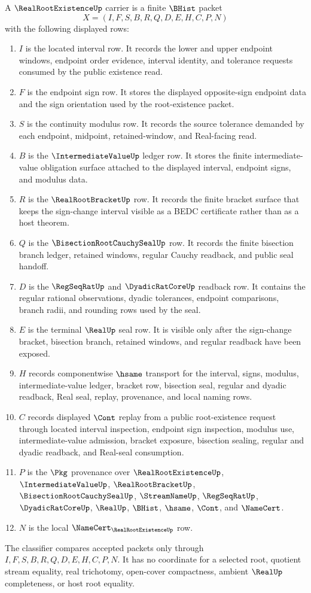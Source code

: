 \begin{definition}\label{def:real-root-existence-carrier}
A $\RealRootExistenceUp$ carrier is a finite $\BHist$ packet
$$
X=(I,F,S,B,R,Q,D,E,H,C,P,N)
$$
with the following displayed rows:
\begin{enumerate}
\item $I$ is the located interval row. It records the lower and upper endpoint windows, endpoint order evidence, interval identity, and tolerance requests consumed by the public existence read.
\item $F$ is the endpoint sign row. It stores the displayed opposite-sign endpoint data and the sign orientation used by the root-existence packet.
\item $S$ is the continuity modulus row. It records the source tolerance demanded by each endpoint, midpoint, retained-window, and Real-facing read.
\item $B$ is the $\IntermediateValueUp$ ledger row. It stores the finite intermediate-value obligation surface attached to the displayed interval, endpoint signs, and modulus data.
\item $R$ is the $\RealRootBracketUp$ row. It records the finite bracket surface that keeps the sign-change interval visible as a BEDC certificate rather than as a host theorem.
\item $Q$ is the $\BisectionRootCauchySealUp$ row. It records the finite bisection branch ledger, retained windows, regular Cauchy readback, and public seal handoff.
\item $D$ is the $\RegSeqRatUp$ and $\DyadicRatCoreUp$ readback row. It contains the regular rational observations, dyadic tolerances, endpoint comparisons, branch radii, and rounding rows used by the seal.
\item $E$ is the terminal $\RealUp$ seal row. It is visible only after the sign-change bracket, bisection branch, retained windows, and regular readback have been exposed.
\item $H$ records componentwise $\hsame$ transport for the interval, signs, modulus, intermediate-value ledger, bracket row, bisection seal, regular and dyadic readback, Real seal, replay, provenance, and local naming rows.
\item $C$ records displayed $\Cont$ replay from a public root-existence request through located interval inspection, endpoint sign inspection, modulus use, intermediate-value admission, bracket exposure, bisection sealing, regular and dyadic readback, and Real-seal consumption.
\item $P$ is the $\Pkg$ provenance over $\RealRootExistenceUp$, $\IntermediateValueUp$, $\RealRootBracketUp$, $\BisectionRootCauchySealUp$, $\StreamNameUp$, $\RegSeqRatUp$, $\DyadicRatCoreUp$, $\RealUp$, $\BHist$, $\hsame$, $\Cont$, and $\NameCert$.
\item $N$ is the local $\NameCert_{\RealRootExistenceUp}$ row.
\end{enumerate}
The classifier compares accepted packets only through $I,F,S,B,R,Q,D,E,H,C,P,N$. It has no coordinate for a selected root, quotient stream equality, real trichotomy, open-cover compactness, ambient $\RealUp$ completeness, or host root equality.
\end{definition}
